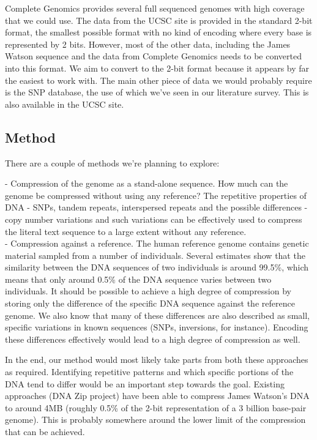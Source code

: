 \documentclass{article}
\begin{document}
Complete Genomics \cite{completegenomics} provides several full sequenced genomes with high coverage that we could use. The data from the UCSC site is provided in the standard 2-bit format, the smallest possible format with no kind of encoding where every base is represented by 2 bits. However, most of the other data, including the James Watson sequence and the data from Complete Genomics needs to be converted into this format. We aim to convert to the 2-bit format because it appears by far the easiest to work with. The main other piece of data we would probably require is the SNP database, the use of which we've seen in our literature survey. This is also available in the UCSC site.

\subsection{Method}
There are a couple of methods we're planning to explore:

- Compression of the genome as a stand-alone sequence. How much can the genome be compressed without using any reference? The repetitive properties of DNA - SNPs, tandem repeats, interspersed repeats and the possible differences - copy number variations and such variations can be effectively used to compress the literal text sequence to a large extent without any reference.\\
- Compression against a reference. The human reference genome contains genetic material sampled from a number of individuals. Several estimates show that the similarity between the DNA sequences of two individuals is around 99.5\%, which means that only around 0.5\% of the DNA sequence varies between two individuals. It should be possible to achieve a high degree of compression by storing only the difference of the specific DNA sequence against the reference genome. We also know that many of these differences are also described as small, specific variations in known sequences (SNPs, inversions, for instance). Encoding these differences effectively would lead to a high degree of compression as well.

In the end, our method would most likely take parts from both these approaches as required. Identifying repetitive patterns and which specific portions of the DNA tend to differ would be an important step towards the goal. Existing approaches (DNA Zip project) have been able to compress James Watson's DNA to around 4MB (roughly 0.5\% of the 2-bit representation of a 3 billion base-pair genome). This is probably somewhere around the lower limit of the compression that can be achieved.
\clearpage
\end{document}
